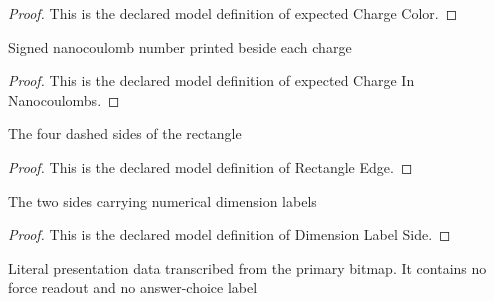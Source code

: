 \begin{proof}
  This is the declared model definition of expected Charge Color.
\end{proof}
\begin{definition}
  \label{def:physics:phyx-mini-0898:phyxminiproblems-problemphyxmini0898-expectedchargeinnanocoulombs}
  Signed nanocoulomb number printed beside each charge
\end{definition}
\begin{proof}
  This is the declared model definition of expected Charge In Nanocoulombs.
\end{proof}
\begin{definition}
  \label{def:physics:phyx-mini-0898:phyxminiproblems-problemphyxmini0898-rectangleedge}
  The four dashed sides of the rectangle
\end{definition}
\begin{proof}
  This is the declared model definition of Rectangle Edge.
\end{proof}
\begin{definition}
  \label{def:physics:phyx-mini-0898:phyxminiproblems-problemphyxmini0898-dimensionlabelside}
  The two sides carrying numerical dimension labels
\end{definition}
\begin{proof}
  This is the declared model definition of Dimension Label Side.
\end{proof}
\begin{definition}
  \label{def:physics:phyx-mini-0898:phyxminiproblems-problemphyxmini0898-threechargerectanglefigure}
  Literal presentation data transcribed from the primary bitmap. It contains no force readout and no answer-choice label
\end{definition}
